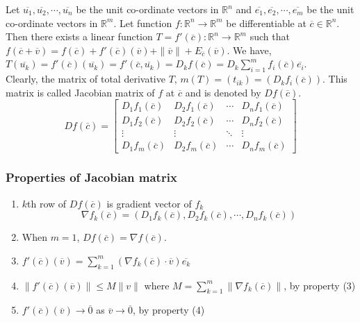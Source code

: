 	Let $\overline{u_1}, \overline{u_2}, \cdots, \overline{u_n}$ be the unit co-ordinate vectors in $\mathbb{R}^n$ and $\overline{e_1}, \overline{e_2}, \cdots, \overline{e_m}$ be the unit co-ordinate vectors in $\mathbb{R}^m$. Let function $f : \mathbb{R}^n \to \mathbb{R}^m$ be differentiable at $\overline{c} \in \mathbb{R}^n$. Then there exists a linear function $T = f'(\overline{c}) : \mathbb{R}^n \to \mathbb{R}^m$ such that $f(\overline{c}+\overline{v}) = f(\overline{c})+f'(\overline{c})(\overline{v}) + \|\overline{v}\|+E_{\overline{c}}(\overline{v})$. We have, $T(\overline{u_k}) = f'(\overline{c})(\overline{u_k}) = f'(\overline{c},\overline{u_k}) = D_kf(\overline{c}) = D_k \sum_{i=1}^m f_i(\overline{c})\overline{e_i}$.\\

	Clearly, the matrix of total derivative $T$, $m(T) = (t_{ik}) = (D_k f_i(\overline{c}))$. This matrix is called Jacobian matrix of $f$ at $\overline{c}$ and is denoted by $Df(\overline{c})$.
	\[ Df(\overline{c}) = \begin{bmatrix} D_1 f_1(\overline{c}) & D_2 f_1(\overline{c}) & \cdots & D_n f_1(\overline{c}) \\ D_1 f_2(\overline{c}) & D_2 f_2(\overline{c}) & \cdots & D_n f_2(\overline{c}) \\ \vdots & \vdots & \ddots & \vdots \\ D_1 f_m(\overline{c}) & D_2 f_m(\overline{c}) & \cdots & D_n f_m(\overline{c}) \end{bmatrix} \]

\subsubsection{Properties of Jacobian matrix}
\begin{enumerate}
	\item $k$th row of $Df(\overline{c})$ is gradient vector of $f_k$
		\[\nabla f_k(\overline{c}) = (D_1f_k(\overline{c}),D_2f_k(\overline{c}),\cdots,D_nf_k(\overline{c}))\]
	\item When $m = 1$, $Df(\overline{c}) = \nabla f(\overline{c})$.
	\item $f'(\overline{c})(\overline{v}) = \sum_{k=1}^m \left(\nabla f_k(\overline{c}) \cdot \overline{v}\right) \overline{e_k}$
	\item $\|f'(\overline{c})(\overline{v})\| \le M\|v\|$ where $M = \sum_{k=1}^m \|\nabla f_k(\overline{c})\| $, by property (3)
	\item $f'(\overline{c})(\overline{v}) \to \overline{0}$ as $\overline{v} \to \overline{0}$, by property (4)
\end{enumerate}

